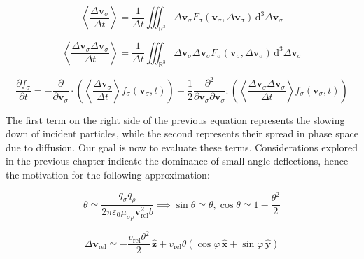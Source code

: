 \begin{equation}
    \left\langle\frac{\Delta\mathbf{v}_\sigma}{\Delta t}\right\rangle=\frac{1}{\Delta t}\iiint_{\mathbb{R}^3}\Delta\mathbf{v}_\sigma F_\sigma(\mathbf{v}_\sigma,\Delta\mathbf{v}_\sigma)\,\mathrm{d}^3\Delta\mathbf{v}_\sigma
\end{equation}

\begin{equation}
    \left\langle\frac{\Delta\mathbf{v}_\sigma\Delta\mathbf{v}_\sigma}{\Delta t}\right\rangle=\frac{1}{\Delta t}\iiint_{\mathbb{R}^3}\Delta\mathbf{v}_\sigma\Delta\mathbf{v}_\sigma F_\sigma(\mathbf{v}_\sigma,\Delta\mathbf{v}_\sigma)\,\mathrm{d}^3\Delta\mathbf{v}_\sigma
\end{equation}

\begin{equation}
    \label{eq-7-17}
    \frac{\partial f_\sigma}{\partial t}=-\frac{\partial}{\partial\mathbf{v}_\sigma}\cdot\left(\left\langle\frac{\Delta\mathbf{v}_\sigma}{\Delta t}\right\rangle f_\sigma(\mathbf{v}_\sigma,t)\right)+\frac{1}{2}\frac{\partial^2}{\partial\mathbf{v}_\sigma\partial\mathbf{v}_\sigma}:\left(\left\langle\frac{\Delta\mathbf{v}_\sigma\Delta\mathbf{v}_\sigma}{\Delta t}\right\rangle f_\sigma(\mathbf{v}_\sigma,t)\right)
\end{equation}

The first term on the right side of the previous equation represents the slowing down of incident particles, while the second represents their spread in phase space due to diffusion. Our goal is now to evaluate these terms. Considerations explored in the previous chapter indicate the dominance of small-angle deflections, hence the motivation for the following approximation:

\begin{equation}
    \theta\simeq\frac{q_\sigma q_\rho }{2\pi\varepsilon_0\mu_{\sigma\rho}\mathbf{v}_\text{rel}^2b}\implies\sin{\theta}\simeq\theta,\cos{\theta}\simeq1-\frac{\theta^2}{2}
\end{equation}

\begin{equation}
    \Delta\mathbf{v}_\text{rel}\simeq-\frac{v_\text{rel}\theta^2}{2}\,\mathbf{\hat{z}}+v_\text{rel}\theta\left(\cos{\varphi}\,\mathbf{\hat{x}}+\sin{\varphi}\,\mathbf{\hat{y}}\right)
\end{equation}

